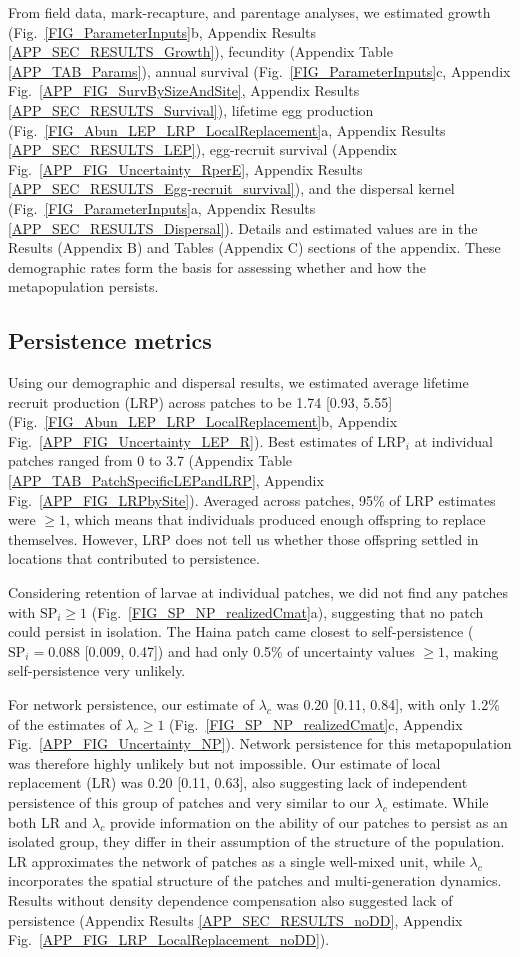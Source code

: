 \documentclass[12pt, oneside]{article}   	%
\begin{document}
From field data, mark-recapture, and parentage analyses, we estimated growth (Fig.\ \ref{FIG_ParameterInputs}b, Appendix Results \ref{APP_SEC_RESULTS_Growth}), fecundity (Appendix Table \ref{APP_TAB_Params}), annual survival (Fig.\ \ref{FIG_ParameterInputs}c, Appendix Fig.\ \ref{APP_FIG_SurvBySizeAndSite}, Appendix Results \ref{APP_SEC_RESULTS_Survival}), lifetime egg production (Fig.\ \ref{FIG_Abun_LEP_LRP_LocalReplacement}a, Appendix Results \ref{APP_SEC_RESULTS_LEP}), egg-recruit survival (Appendix Fig.\ \ref{APP_FIG_Uncertainty_RperE}, Appendix Results \ref{APP_SEC_RESULTS_Egg-recruit_survival}), and the dispersal kernel (Fig.\ \ref{FIG_ParameterInputs}a, Appendix Results \ref{APP_SEC_RESULTS_Dispersal}). Details and estimated values are in the Results (Appendix B) and Tables (Appendix C) sections of the appendix. These demographic rates form the basis for assessing whether and how the metapopulation persists.

\subsection*{Persistence metrics}

Using our demographic and dispersal results, we estimated average lifetime recruit production (LRP) across patches to be 1.74 [0.93, 5.55] (Fig.\ \ref{FIG_Abun_LEP_LRP_LocalReplacement}b, Appendix Fig.\ \ref{APP_FIG_Uncertainty_LEP_R}). Best estimates of $\text{LRP}_i$ at individual patches ranged from 0 to 3.7 (Appendix Table \ref{APP_TAB_PatchSpecificLEPandLRP}, Appendix Fig.\ \ref{APP_FIG_LRPbySite}). Averaged across patches, 95\% of LRP estimates were $\geq 1$, which means that individuals produced enough offspring to replace themselves. However, LRP does not tell us whether those offspring settled in locations that contributed to persistence.

Considering retention of larvae at individual patches, we did not find any patches with $\text{SP}_{i} \geq 1$ (Fig.\ \ref{FIG_SP_NP_realizedCmat}a), suggesting that no patch could persist in isolation. The Haina patch came closest to self-persistence ($\text{SP}_i = 0.088$ [0.009, 0.47]) and had only 0.5\% of uncertainty values $ \geq 1$, making self-persistence very unlikely. 

For network persistence, our estimate of $\lambda_{c}$ was 0.20 [0.11, 0.84], with only 1.2\% of the estimates of $\lambda_c \geq 1$ (Fig.\ \ref{FIG_SP_NP_realizedCmat}c, Appendix Fig.\ \ref{APP_FIG_Uncertainty_NP}). Network persistence for this metapopulation was therefore highly unlikely but not impossible. Our estimate of local replacement (LR) was 0.20 [0.11, 0.63], also suggesting lack of independent persistence of this group of patches and very similar to our $\lambda_{c}$ estimate. While both LR and $\lambda_{c}$ provide information on the ability of our patches to persist as an isolated group, they differ in their assumption of the structure of the population. LR approximates the network of patches as a single well-mixed unit, while $\lambda_{c}$ incorporates the spatial structure of the patches and multi-generation dynamics. Results without density dependence compensation also suggested lack of persistence (Appendix Results \ref{APP_SEC_RESULTS_noDD}, Appendix Fig.\ \ref{APP_FIG_LRP_LocalReplacement_noDD}).
\end{document}
